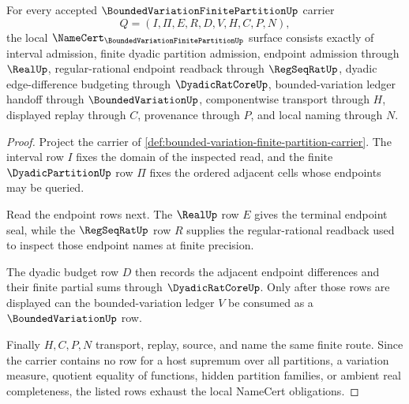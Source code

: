 \begin{theorem}
\label{thm:bounded-variation-finite-partition-namecert-obligations}
For every accepted $\BoundedVariationFinitePartitionUp$ carrier
$$
Q=(I,\Pi,E,R,D,V,H,C,P,N),
$$
the local $\NameCert_{\BoundedVariationFinitePartitionUp}$ surface consists exactly of interval admission, finite dyadic partition admission, endpoint admission through $\RealUp$, regular-rational endpoint readback through $\RegSeqRatUp$, dyadic edge-difference budgeting through $\DyadicRatCoreUp$, bounded-variation ledger handoff through $\BoundedVariationUp$, componentwise transport through $H$, displayed replay through $C$, provenance through $P$, and local naming through $N$.
\end{theorem}
\begin{proof}
Project the carrier of \autoref{def:bounded-variation-finite-partition-carrier}. The interval row $I$ fixes the domain of the inspected read, and the finite $\DyadicPartitionUp$ row $\Pi$ fixes the ordered adjacent cells whose endpoints may be queried.

Read the endpoint rows next. The $\RealUp$ row $E$ gives the terminal endpoint seal, while the $\RegSeqRatUp$ row $R$ supplies the regular-rational readback used to inspect those endpoint names at finite precision.

The dyadic budget row $D$ then records the adjacent endpoint differences and their finite partial sums through $\DyadicRatCoreUp$. Only after those rows are displayed can the bounded-variation ledger $V$ be consumed as a $\BoundedVariationUp$ row.

Finally $H,C,P,N$ transport, replay, source, and name the same finite route. Since the carrier contains no row for a host supremum over all partitions, a variation measure, quotient equality of functions, hidden partition families, or ambient real completeness, the listed rows exhaust the local NameCert obligations.
\end{proof}

